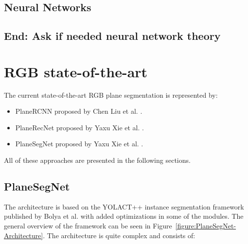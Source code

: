 \subsection{Neural Networks} \label{subsec:neural-networks}

\subsection{End: Ask if needed neural network theory}

\section{RGB state-of-the-art}

The current state-of-the-art RGB plane segmentation is represented by:
\begin{itemize}
\item PlaneRCNN proposed by Chen Liu et al. \cite{articlePlaneRCNN}.
\item PlaneRecNet proposed by Yaxu Xie et al. \cite{xie2021planerecnet}.
\item PlaneSegNet proposed by Yaxu Xie et al. \cite{inproceedingsPlaneSegNet}.
\end{itemize}

All of these approaches are presented in the following sections.

\subsection{PlaneSegNet}

The architecture is based on the YOLACT++ instance segmentation framework published by
Bolya et al. \cite{articleYOLACT} with added optimizations in some of the modules.
The general overview of the framework can be seen in Figure~\ref{figure:PlaneSegNet-Architecture}.
The architecture is quite complex and consists of:

